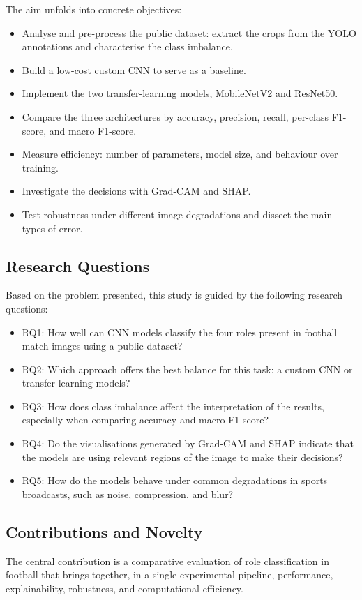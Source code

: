 \documentclass[preprint,12pt]{elsarticle}
\begin{document}
The aim unfolds into concrete objectives:
\begin{itemize}
    \item Analyse and pre-process the public dataset: extract the crops from the YOLO annotations and characterise the class imbalance.
    \item Build a low-cost custom CNN to serve as a baseline.
    \item Implement the two transfer-learning models, MobileNetV2 and ResNet50.
    \item Compare the three architectures by accuracy, precision, recall, per-class F1-score, and macro F1-score.
    \item Measure efficiency: number of parameters, model size, and behaviour over training.
    \item Investigate the decisions with Grad-CAM and SHAP.
    \item Test robustness under different image degradations and dissect the main types of error.
\end{itemize}

\subsection{Research Questions}

Based on the problem presented, this study is guided by the following research questions:

\begin{itemize}
    \item RQ1: How well can CNN models classify the four roles present in football match images using a public dataset?
    \item RQ2: Which approach offers the best balance for this task: a custom CNN or transfer-learning models?
    \item RQ3: How does class imbalance affect the interpretation of the results, especially when comparing accuracy and macro F1-score?
    \item RQ4: Do the visualisations generated by Grad-CAM and SHAP indicate that the models are using relevant regions of the image to make their decisions?
    \item RQ5: How do the models behave under common degradations in sports broadcasts, such as noise, compression, and blur?
\end{itemize}

\subsection{Contributions and Novelty}
The central contribution is a comparative evaluation of role classification in football that brings together, in a single experimental pipeline, performance, explainability, robustness, and computational efficiency.
\end{document}
